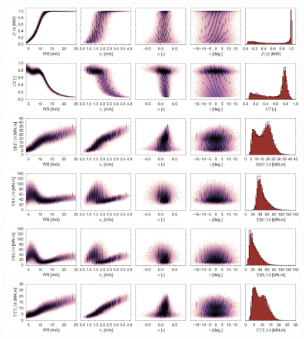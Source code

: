 \documentclass[preprint,12pt]{elsarticle}
\begin{document}
\begin{figure}[p]
\begin{centering}
\includegraphics[width=\columnwidth]{Figures/Full_surrogate_red_file/P_PCE_MC_surrogate_last_row.jpg} \\
\includegraphics[width=\columnwidth]{Figures/Full_surrogate_red_file/CT_PCE_MC_surrogate_last_row.jpg} \\
\includegraphics[width=\columnwidth]{Figures/Full_surrogate_red_file/BRFBM_EFL_M12_PCE_MC_surrogate_last_row.jpg} \\
\includegraphics[width=\columnwidth]{Figures/Full_surrogate_red_file/TBFBM_EFL_M4_PCE_MC_surrogate_last_row.jpg} \\
\includegraphics[width=\columnwidth]{Figures/Full_surrogate_red_file/TBSBM_EFL_M4_PCE_MC_surrogate_last_row.jpg} \\
\includegraphics[width=\columnwidth]{Figures/Full_surrogate_red_file/TTTBM_EFL_M4_PCE_MC_surrogate_last_row.jpg} \\

\end{centering}
\end{figure}
\end{document}
